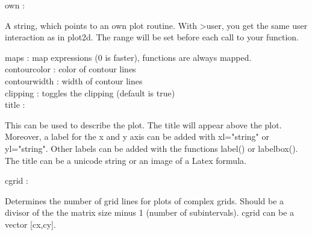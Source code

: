 \documentclass[a4paper,10pt]{article}
\begin{document}
\begin{eulernotebook}
\begin{eulercomment}
\begin{eulercomment}
\begin{eulercomment}
\begin{eulercomment}
\begin{eulercomment}
\begin{eulercomment}
\begin{eulercomment}
\begin{eulercomment}
\begin{eulercomment}
\begin{eulercomment}
\begin{eulercomment}
\begin{eulercomment}
\begin{eulercomment}
\begin{eulercomment}
\begin{eulercomment}
\begin{eulercomment}
\begin{eulercomment}
\begin{eulercomment}
\begin{eulercomment}
\begin{eulercomment}
\begin{eulercomment}
\begin{eulercomment}
\begin{eulercomment}
\begin{eulercomment}
\begin{eulercomment}
\begin{eulercomment}
\begin{eulercomment}
\begin{eulercomment}
\begin{eulercomment}
\begin{eulercomment}
\begin{eulercomment}
\begin{eulercomment}
\begin{eulercomment}
\begin{eulercomment}
\begin{eulercomment}
\begin{eulercomment}
\begin{eulercomment}
own       :\\
\end{eulercomment}
\begin{eulerttcomment}
  A string, which points to an own plot routine. With >user, you get
  the same user interaction as in plot2d. The range will be set
  before each call to your function.
\end{eulerttcomment}
\begin{eulercomment}
maps      : map expressions (0 is faster), functions are always mapped.\\
contourcolor : color of contour lines\\
contourwidth : width of contour lines\\
clipping  : toggles the clipping (default is true)\\
title     :\\
\end{eulercomment}
\begin{eulerttcomment}
  This can be used to describe the plot. The title will appear above
  the plot. Moreover, a label for the x and y axis can be added with
  xl="string" or yl="string". Other labels can be added with the
  functions label() or labelbox(). The title can be a unicode
  string or an image of a Latex formula.
\end{eulerttcomment}
\begin{eulercomment}
cgrid     :\\
\end{eulercomment}
\begin{eulerttcomment}
  Determines the number of grid lines for plots of complex grids.
  Should be a divisor of the the matrix size minus 1 (number of
  subintervals). cgrid can be a vector [cx,cy].
\end{eulerttcomment}

\end{eulercomment}
\end{eulercomment}
\end{eulercomment}
\end{eulercomment}
\end{eulercomment}
\end{eulercomment}
\end{eulercomment}
\end{eulercomment}
\end{eulercomment}
\end{eulercomment}
\end{eulercomment}
\end{eulercomment}
\end{eulercomment}
\end{eulercomment}
\end{eulercomment}
\end{eulercomment}
\end{eulercomment}
\end{eulercomment}
\end{eulercomment}
\end{eulercomment}
\end{eulercomment}
\end{eulercomment}
\end{eulercomment}
\end{eulercomment}
\end{eulercomment}
\end{eulercomment}
\end{eulercomment}
\end{eulercomment}
\end{eulercomment}
\end{eulercomment}
\end{eulercomment}
\end{eulercomment}
\end{eulercomment}
\end{eulercomment}
\end{eulercomment}
\end{eulercomment}
\end{eulernotebook}
\end{document}
